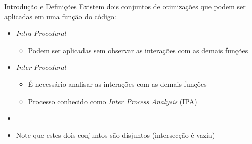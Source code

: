 %
%
%
%
%
%
%

\begin{frame}{Introdução e Definições}
    Existem dois conjuntos de otimizações que podem ser aplicadas em uma função do código:
  \begin{itemize}
    \item \textit{Intra Procedural}
        \begin{itemize}
            \item Podem ser aplicadas sem observar as interações com as demais funções
        \end{itemize}
    \item \textit{Inter Procedural}
        \begin{itemize}
            \item É necessário analisar as interações com as demais funções
            \item Processo conhecido como \textit{Inter Process Analysis} (IPA)
        \end{itemize}
    \item[]
    \item Note que estes dois conjuntos são disjuntos (intersecção é vazia)
  \end{itemize}
\end{frame}

